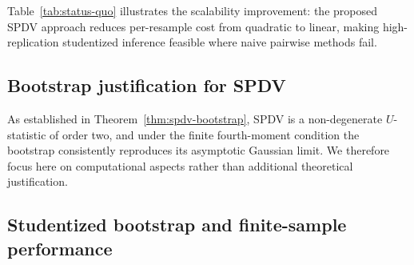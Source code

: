 \documentclass[12pt,a4paper]{article}
\begin{document}
\begin{table}[htbp]
\centering
\caption{Comparison of computational complexity and scalability: Status quo vs.\ proposed SPDV approach for studentized bootstrap variance inference.}
\label{tab:status-quo}
\end{table}

Table~\ref{tab:status-quo} illustrates the scalability improvement: the proposed SPDV approach reduces per-resample cost from quadratic to linear, making high-replication studentized inference feasible where naive pairwise methods fail.

\subsection{Bootstrap justification for SPDV}

As established in Theorem~\ref{thm:spdv-bootstrap}, SPDV is a non-degenerate $U$-statistic of order two, and under the finite fourth-moment condition the bootstrap consistently reproduces its asymptotic Gaussian limit. We therefore focus here on computational aspects rather than additional theoretical justification.

\subsection{Studentized bootstrap and finite-sample performance}
\end{document}
